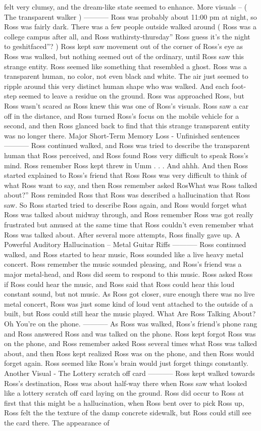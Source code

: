 \documentclass[12pt]{book}
\begin{document}
felt very clumsy, and the dream-like state seemed to enhance. More visuals -- ( The transparent walker ) ----------- Ross was probably about 11:00 pm at night, so Ross was fairly dark. There was a few people outside walked around ( Ross was a college campus after all, and Ross wathirsty-thursday'' Ross guess it's the night to geshitfaced''? ) Ross kept saw movement out of the corner of Ross's eye as Ross was walked, but nothing seemed out of the ordinary, until Ross saw this strange entity. Ross seemed like something that resembled a ghost. Ross was a transparent human, no color, not even black and white. The air just seemed to ripple around this very distinct human shape who was walked. And each foot-step seemed to leave a residue on the ground. Ross was approached Ross, but Ross wasn't scared as Ross knew this was one of Ross's visuals. Ross saw a car off in the distance, and Ross turned Ross's focus on the mobile vehicle for a second, and then Ross glanced back to find that this strange transparent entity was no longer there. Major Short-Term Memory Loss - Unfinished sentences ----------- Ross continued walked, and Ross was tried to describe the transparent human that Ross perceived, and Ross found Ross very difficult to speak Ross's mind. Ross remember Ross kept threw in Umm . . .  And ahhh. And then Ross started explained to Ross's friend that Ross Ross was very difficult to think of what Ross want to say, and then Ross remember asked RosWhat was Ross talked about?'' Ross reminded Ross that Ross was described a hallucination that Ross saw. So Ross started tried to describe Ross again, and Ross would forget what Ross was talked about midway through, and Ross remember Ross was got really frustrated but amused at the same time that Ross couldn't even remember what Ross was talked about. After several more attempts, Ross finally gave up. A Powerful Auditory Hallucination -- Metal Guitar Riffs ----------- Ross continued walked, and Ross started to hear music, Ross sounded like a live heavy metal concert. Ross remember the music sounded pleasing, and Ross's friend was a major metal-head, and Ross did seem to respond to this music. Ross asked Ross if Ross could hear the music, and Ross said that Ross could hear this loud constant sound, but not music. As Ross got closer, sure enough there was no live metal concert, Ross was just some kind of loud vent attached to the outside of a built, but Ross could still hear the music played. What Are Ross Talking About? Oh You're on the phone. ----------- As Ross was walked, Ross's friend's phone rang and Ross answered Ross and was talked on the phone. Ross kept forgot Ross was on the phone, and Ross remember asked Ross several times what Ross was talked about, and then Ross kept realized Ross was on the phone, and then Ross would forget again. Ross seemed like Ross's brain would just forget things constantly. Another Visual - The Lottery scratch off card ----------- Ross kept walked towards Ross's destination, Ross was about half-way there when Ross saw what looked like a lottery scratch off card laying on the ground. Ross did occur to Ross at first that this might be a hallucination, when Ross bent over to pick Ross up, Ross felt the the texture of the damp concrete sidewalk, but Ross could still see the card there. The appearance of 
\end{document}
